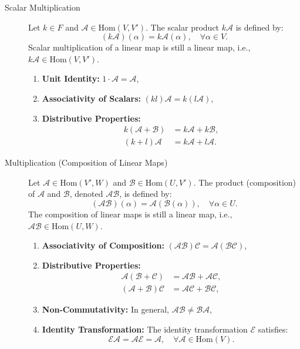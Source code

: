 \documentclass[11pt]{../../TexTemplate/elegantbook} %
\begin{document}
\begin{description}
    \item[Scalar Multiplication] 
        Let \(k \in F\) and \(\mathcal{A} \in \mathrm{Hom}(V,V')\). The scalar product \(k \mathcal{A}\) is defined by:
        \[
        (k\mathcal{A})(\alpha) = k \mathcal{A}(\alpha), \quad \forall \alpha \in V.
        \]
        Scalar multiplication of a linear map is still a linear map, i.e., \(k \mathcal{A} \in \mathrm{Hom}(V,V')\).
        \begin{enumerate}
            \item \textbf{Unit Identity:} \(1 \cdot \mathcal{A} = \mathcal{A}\),
            \item \textbf{Associativity of Scalars:} \((kl)\mathcal{A} = k(l\mathcal{A})\),
            \item \textbf{Distributive Properties:}
            \begin{align*}
                k(\mathcal{A+B}) &= k\mathcal{A} + k\mathcal{B}, \\
                (k+l)\mathcal{A} &= k\mathcal{A} + l\mathcal{A}.
            \end{align*}
        \end{enumerate}
    \item[Multiplication (Composition of Linear Maps)]
        Let \(\mathcal{A} \in \mathrm{Hom}(V',W)\) and \(\mathcal{B} \in \mathrm{Hom}(U,V')\). 
        The product (composition) of \(\mathcal{A}\) and \(\mathcal{B}\), denoted \(\mathcal{AB}\), is defined by:
        \[
        (\mathcal{AB})(\alpha) = \mathcal{A}(\mathcal{B}(\alpha)), \quad \forall \alpha \in U.
        \]
        The composition of linear maps is still a linear map, i.e., \(\mathcal{AB} \in \mathrm{Hom}(U,W)\).
        \begin{enumerate}
            \item \textbf{Associativity of Composition:} \((\mathcal{AB})\mathcal{C} = \mathcal{A}(\mathcal{BC})\),
            \item \textbf{Distributive Properties:}
            \begin{align*}
                \mathcal{A}(\mathcal{B+C}) &= \mathcal{AB + AC}, \\
                (\mathcal{A+B})\mathcal{C} &= \mathcal{AC+BC},
            \end{align*}
            \item \textbf{Non-Commutativity:} In general, \(\mathcal{AB} \neq \mathcal{BA}\),
            \item \textbf{Identity Transformation:} The identity transformation \(\mathcal{E}\) satisfies:
            \[
            \mathcal{EA} = \mathcal{AE} = \mathcal{A}, \quad \forall \mathcal{A} \in \mathrm{Hom}(V).
            \]
        \end{enumerate}
\end{description}
\end{document}
